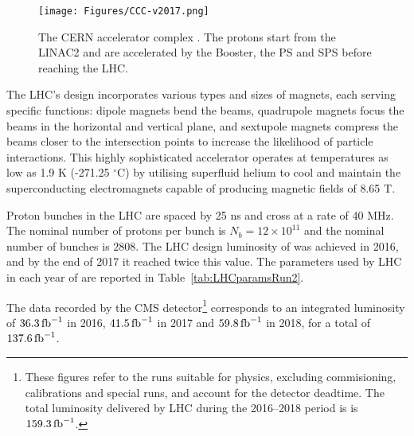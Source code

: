 \begin{figure}[htb]
\begin{center}
\texttt{[image: Figures/CCC-v2017.png]}
\end{center}
\caption{The CERN accelerator complex \cite{OPEN-PHO-ACCEL-2016-009}. The protons start from the LINAC2 and are accelerated by the Booster, the PS and SPS before reaching the LHC.}
\label{fig:CERNaccelerators}
\end{figure}

The LHC's design incorporates various types and sizes of magnets, each serving specific functions: dipole magnets bend the beams,
quadrupole magnets focus the beams in the horizontal and vertical plane,
and sextupole magnets compress the beams closer to the intersection points to increase the likelihood of particle interactions.
This highly sophisticated accelerator operates at temperatures as low as 1.9 K (-271.25 $^\circ$C) by utilising superfluid helium to cool and maintain the superconducting electromagnets capable of producing magnetic fields of 8.65 T.

Proton bunches in the LHC are spaced by 25 ns and cross at a rate of 40 MHz.
The nominal number of protons per bunch is $N_b = 12 \times 10^{11}$ and the nominal number of bunches is $2808$.
The LHC design luminosity of \LHigh was achieved in 2016, and by the end of 2017 it reached twice this value.
The parameters used by LHC in each year of \RunII{} are reported in Table~\ref{tab:LHCparamsRun2}.

The data recorded by the CMS detector\footnote{
These figures refer to the runs suitable for physics, \eg excluding commisioning, calibrations and special runs, and account for the detector deadtime.
The total luminosity delivered by LHC during the 2016--2018 period is is $159.3\mbox{\ensuremath{\,\text{fb}^{-1}}}$.}
corresponds to an integrated luminosity of $36.3\mbox{\ensuremath{\,\text{fb}^{-1}}}$ in 2016, $41.5\mbox{\ensuremath{\,\text{fb}^{-1}}}$ in 2017 and $59.8\mbox{\ensuremath{\,\text{fb}^{-1}}}$ in 2018,
for a total of $137.6\mbox{\ensuremath{\,\text{fb}^{-1}}}$.

